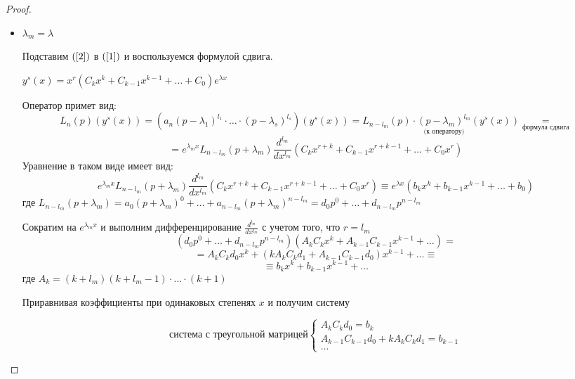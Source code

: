 \begin{proof}
    \hfill
\begin{itemize}
    \item $\lambda_m=\lambda$ \par
    Подставим $(\ref{2})$  в $(\ref{1})$ и воспользуемся формулой сдвига.\par
    $y^s(x)=x^r(C_kx^k+C_{k-1}x^{k-1}+\dots + C_0)e^{\lambda x}$\par
    Оператор примет вид:
    $$L_n(p)(y^s(x))=(a_n(p-\lambda_1)^{l_1}\cdot\dots\cdot (p-\lambda_s)^{l_s})(y^s(x))=
    L_{n-l_m}(p)\cdot \underset{\text{(к оператору)}}{(p-\lambda_m)^{l_m}}(y^s(x))\underset{\text{формула сдвига}}{=}
    $$$$=e^{\lambda_m x}L_{n-l_m}(p+\lambda_m)\frac{d^{l_m}}{dx^{l_m}}(C_kx^{r+k}+C_{k-1}x^{r+k-1}+\dots+C_0x^r)$$
    Уравнение в таком виде имеет вид:
    $$e^{\lambda_m x}L_{n-l_m}(p+\lambda_m)\frac{d^{l_m}}{dx^{l_m}}(C_kx^{r+k}+C_{k-1}x^{r+k-1}+\dots+C_0x^r)\equiv e^{\lambda x}(b_kx^k+b_{k-1}x^{k-1}+\dots+b_0)$$
    где $L_{n-l_m}(p+\lambda_m)=a_0(p+\lambda_m)^0+\dots+ a_{n-l_m}(p+\lambda_m)^{n-l_m}=d_0p^0+\dots+ d_{n-l_m}p^{n-l_m}$\par
    Сократим на $e^{\lambda_m x}$ и выполним дифференцирование $\frac{d^{l_m}}{dx^{l_m}}$ с учетом того, что $r=l_m$
    $$(d_0p^0+\dots + d_{n-l_m}p^{n-l_m})(A_kC_kx^k+A_{k-1}C_{k-1}x^{k-1}+\dots)=$$
    $$=A_kC_kd_0x^k+(kA_kC_kd_1+A_{k-1}C_{k-1}d_0)x^{k-1}+\dots \equiv$$$$\equiv b_kx^k+b_{k-1}x^{k-1}+\dots$$ где $A_k=(k+l_m)(k+l_m-1)\cdot \dots \cdot (k+1)$\par
    Приравнивая коэффициенты при одинаковых степенях $x$ и получим систему 

    \begin{equation}
       \text{система с треугольной матрицей}
        \begin{cases}
            A_kC_kd_0=b_k\\
            A_{k-1}C_{k-1}d_0+kA_kC_kd_1=b_{k-1}\\
            \dots
        \end{cases}
    \end{equation}


\end{itemize}
\end{proof}
